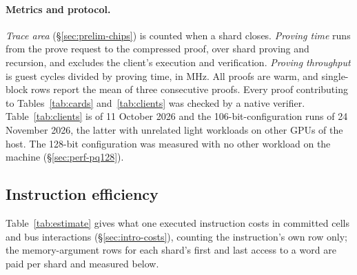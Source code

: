 \paragraph{Metrics and protocol.} \emph{Trace area} (\S\ref{sec:prelim-chips}) is counted when a shard closes. \emph{Proving time} runs from the prove request to the compressed proof, over shard proving and recursion, and excludes the client's execution and verification. \emph{Proving throughput} is guest cycles divided by proving time, in MHz. All proofs are warm, and single-block rows report the mean of three consecutive proofs. Every proof contributing to Tables~\ref{tab:cards} and~\ref{tab:clients} was checked by a native verifier. Table~\ref{tab:clients} is of 11 October 2026 and the 106-bit-configuration runs of 24 November 2026, the latter with unrelated light workloads on other GPUs of the host. The 128-bit configuration was measured with no other workload on the machine (\S\ref{sec:perf-pq128}).

\subsection{Instruction efficiency}
\label{sec:perf-estimate}

Table~\ref{tab:estimate} gives what one executed instruction costs in committed cells and bus interactions (\S\ref{sec:intro-costs}), counting the instruction's own row only; the memory-argument rows for each shard's first and last access to a word are paid per shard and measured below.

